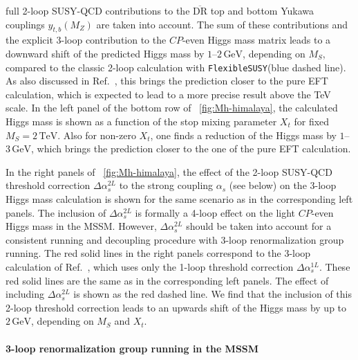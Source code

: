 \documentclass[final,3p,11pt,pdflatex]{elsarticle}
\makeatletter
\newcommand{\fs}{\texttt{FlexibleSUSY}\@\xspace}
\newcommand{\ol}[1]{\overline{#1}}
\newcommand{\DRbar}{\ensuremath{\ol{\text{DR}}}\xspace}
\newcommand{\unit}[1]{\,\text{#1}}      %
\newcommand{\MS}{\ensuremath{M_S}\xspace}
\newcommand{\figref}[1]{\figurename~\ref{#1}}
\newcommand{\CP}{\ensuremath{CP}\xspace}
\newcommand{\SQCD}{SUSY-QCD\xspace}
\def\as{\alpha_s}
\makeatother
\begin{document}
full 2-loop \SQCD contributions to the \DRbar top and bottom Yukawa
couplings $y_{t,b}(M_Z)$ \cite{Bednyakov:2007vm,Bednyakov:2002sf,Bednyakov:2005kt}
are taken into account.  The sum of these contributions
and the explicit 3-loop contribution to the \CP-even
Higgs mass matrix leads to a downward shift of the predicted Higgs
mass by $1$--$2\unit{GeV}$, depending on \MS, compared to the classic 2-loop
calculation with \fs (blue dashed line).  As also discussed in
Ref.~\cite{Harlander:2017kuc}, this brings the prediction closer to the pure
EFT calculation, which is expected to lead to a more precise result above
the TeV scale.  In the left panel of the bottom row of
\figref{fig:Mh-himalaya}, the calculated Higgs mass is shown as a
function of the stop mixing parameter $X_t$ for fixed
$\MS = 2\unit{TeV}$.  Also for non-zero
$X_t$, one finds a reduction of the Higgs mass by
$1$--$3\unit{GeV}$, which brings the prediction closer to the one of
the pure EFT calculation.

In the right panels of \figref{fig:Mh-himalaya}, the effect of the 2-loop
\SQCD threshold correction $\Delta\as^{2L}$
\cite{Harlander:2005wm,Bauer:2008bj,Bednyakov:2010ni} to the strong
coupling $\as$ (see below) on the 3-loop Higgs mass calculation is shown for
the same scenario as in the corresponding left panels.  The inclusion
of $\Delta\as^{2L}$ is formally a 4-loop effect on the light
\CP-even Higgs mass in the MSSM\@.  However, $\Delta\as^{2L}$ should
be taken into account for a consistent running and decoupling
procedure with 3-loop renormalization group running.  The red solid
lines in the right panels correspond to the 3-loop calculation of
Ref.~\cite{Harlander:2017kuc}, which uses only the 1-loop threshold correction
$\Delta\as^{1L}$.  These red solid lines are the same as in the
corresponding left panels.  The effect of including
$\Delta\as^{2L}$ is shown as the red dashed line.  We find that the
inclusion of this 2-loop threshold correction leads to an upwards
shift of the Higgs mass by up to $2\unit{GeV}$, depending on \MS and
$X_t$.

\paragraph{3-loop renormalization group running in the MSSM}
\end{document}
